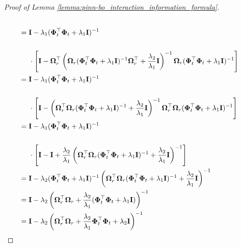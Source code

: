 \begin{proof}[Proof of Lemma \ref{lemma:pinn-bo_interaction_information_formula}]
\begin{align*}
            \\
            &  = \mathbf{I} -  \lambda_1(\boldsymbol{\Phi}_t^\top\boldsymbol{\Phi}_t+\lambda_1 \mathbf{I})^{-1} \\ \notag
            \\ 
            & \;\;\;\;\;    \cdot \left[\mathbf{I} - \boldsymbol{\Omega}_r^\top \left(\boldsymbol{\Omega}_r(\boldsymbol{\Phi}_t^\top \boldsymbol{\Phi}_t+ \lambda_1\mathbf{I})^{-1}\boldsymbol{\Omega}_r^\top+\frac{\lambda_2} {\lambda_1} \mathbf{I}\right)^{-1} \boldsymbol{\Omega}_r (\boldsymbol{\Phi}_t^\top\boldsymbol{\Phi}_t+\lambda_1 \mathbf{I})^{-1} \right]
            \\
            & = \mathbf{I} -  \lambda_1(\boldsymbol{\Phi}_t^\top\boldsymbol{\Phi}_t+\lambda_1 \mathbf{I})^{-1} \\ \notag 
            \\
            & \;\;\;\;\; \cdot \left[\mathbf{I} -  \left(\boldsymbol{\Omega}_r^\top\boldsymbol{\Omega}_r(\boldsymbol{\Phi}_t^\top \boldsymbol{\Phi}_t+ \lambda_1\mathbf{I})^{-1}+\frac{\lambda_2} {\lambda_1} \mathbf{I}\right)^{-1} \boldsymbol{\Omega}_r^\top\boldsymbol{\Omega}_r (\boldsymbol{\Phi}_t^\top\boldsymbol{\Phi}_t+\lambda_1 \mathbf{I})^{-1}\right] \\ 
            & = \mathbf{I} -  \lambda_1(\boldsymbol{\Phi}_t^\top\boldsymbol{\Phi}_t+\lambda_1 \mathbf{I})^{-1} \\ \notag 
            \\
            & \;\;\;\;\; \cdot \left[\mathbf{I} -  \mathbf{I} + \frac{\lambda_2}{\lambda_1}\left(\boldsymbol{\Omega}_r^\top\boldsymbol{\Omega}_r(\boldsymbol{\Phi}_t^\top \boldsymbol{\Phi}_t+ \lambda_1\mathbf{I})^{-1}+\frac{\lambda_2} {\lambda_1} \mathbf{I}\right)^{-1} \right] \\ 
            & = \mathbf{I} - \lambda_2 (\boldsymbol{\Phi}_t^\top \boldsymbol{\Phi}_t+ \lambda_1\mathbf{I})^{-1}\left(\boldsymbol{\Omega}_r^\top\boldsymbol{\Omega}_r(\boldsymbol{\Phi}_t^\top \boldsymbol{\Phi}_t+ \lambda_1\mathbf{I})^{-1}+\frac{\lambda_2} {\lambda_1} \mathbf{I}\right)^{-1} \\
            & =\mathbf{I} - \lambda_2 \left(\boldsymbol{\Omega}_r^\top\boldsymbol{\Omega}_r+\frac{\lambda_2} {\lambda_1} (\boldsymbol{\Phi}_t^\top \boldsymbol{\Phi}_t+ \lambda_1\mathbf{I})\right)^{-1} \\
            & =\mathbf{I} - \lambda_2 \left(\boldsymbol{\Omega}_r^\top\boldsymbol{\Omega}_r+\frac{\lambda_2} {\lambda_1} \boldsymbol{\Phi}_t^\top \boldsymbol{\Phi}_t+ \lambda_2 \mathbf{I}\right)^{-1}  

\end{align*}
\end{proof}
